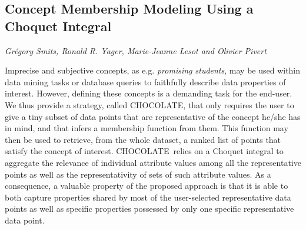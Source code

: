 \documentclass[../booklet.tex]{subfiles}
\begin{document}
\subsection[Concept Membership Modeling Using a Choquet Integral. {\it Grégory Smits, Ronald R. Yager, Marie-Jeanne Lesot and Olivier Pivert}]{Concept Membership Modeling Using a Choquet Integral}
   

\begin{center}
  {\it Grégory Smits, Ronald R. Yager, Marie-Jeanne Lesot and Olivier Pivert}
\end{center}


\newcommand{\nom}{CHOCOLATE}

  Imprecise and subjective concepts, as e.g. {\it promising students}, 
  may be used within data mining tasks or database queries to faithfully describe
  data properties of interest.
  However, defining these concepts is a demanding task for
  the end-user. We thus provide a strategy, called \nom, that
  only requires the user to give a tiny subset of data points that
  are representative of the concept he/she has in mind, and that
  infers a membership function from them. This function may then be
  used to retrieve, from the whole dataset, a ranked list of points that satisfy the concept of interest. \nom\ relies on a
  Choquet integral to aggregate the relevance of individual attribute
  values among all the representative points as well as the
  representativity of sets of such attribute values.  As a
  consequence, a valuable property of the proposed approach is that it
  is able to both capture properties shared by most of the
  user-selected representative data points as well as specific
  properties possessed by only one specific representative data point.
\end{document}
